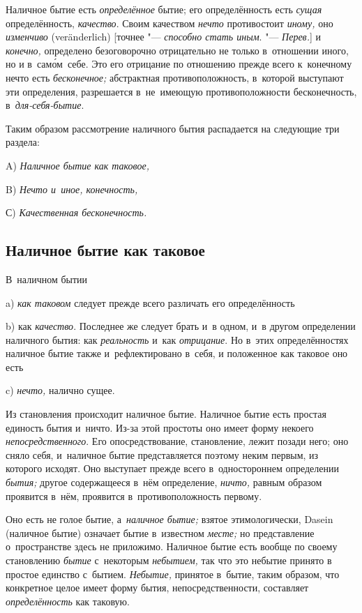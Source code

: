 Наличное бытие есть {\em определённое} бытие; его определённость есть
{\em сущая} определённость, {\em качество}. Своим качеством {\em нечто}
противостоит {\em иному,} оно {\em изменчиво} (ver\-änder\-lich)
[точнее "--- {\em способно стать иным}. "--- {\em Перев.}] и {\em конечно,}
определено безоговорочно отрицательно не только в~отношении иного, но и
в~сам\'{о}м~себе. Это его отрицание по отношению прежде всего к~конечному нечто
есть {\em бесконечное;} абстрактная противоположность, в~которой выступают эти
определения, разрешается в~не~имеющую противоположности бесконечность,
в~{\em для-себя-бытие}.

Таким образом рассмотрение наличного бытия
распадается на следующие три раздела:

A) {\em Наличное бытие как таковое,}

B) {\em Нечто и~иное, конечность,}

С) {\em Качественная бесконечность.}

\subsection{Наличное бытие как таковое}

В~наличном бытии

a) {\em как таковом} следует прежде всего различать его определённость

b) как {\em качество}. Последнее же следует брать и~в одном, и~в другом
определении наличного бытия: как {\em реальность} и~как {\em отрицание}.
Но в~этих определённостях наличное бытие также и~рефлектировано в~себя,
и положенное как таковое оно есть

c) {\em нечто,} налично сущее.


Из становления происходит наличное бытие. Наличное бытие есть простая единость
бытия и~ничто. Из-за этой простоты оно имеет форму некоего
{\em непосредственного}. Его опосредствование, становление, лежит позади него;
оно сняло себя, и~наличное бытие представляется поэтому неким первым, из
которого исходят. Оно выступает прежде всего в~одностороннем определении
{\em бытия;} другое содержащееся в~нём определение, {\em ничто,} равным
образом проявится в~нём, проявится в~противоположность первому.

Оно есть не голое бытие, а~{\em наличное бытие;} взятое этимологически, Dasein
(наличное бытие) означает бытие в~известном {\em месте;} но представление
о~пространстве здесь не приложимо. Наличное бытие есть вообще по своему
становлению {\em бытие} с~некоторым {\em небытием,} так что это небытие принято
в простое единство с~бытием. {\em Небытие,} принятое в~бытие, таким образом,
что конкретное целое имеет форму бытия, непосредственности, составляет
{\em определённость} как таковую.

